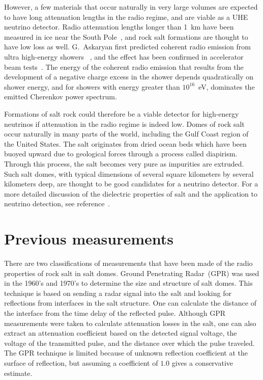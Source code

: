 \documentclass{elsart}
\begin{document}
  However, a few materials that occur naturally in very large volumes are expected to have 
  long attenuation lengths in the radio regime, and are 
  viable as a UHE neutrino detector.  Radio attenuation 
  lengths longer 
  than 1~km have been measured in ice near the South Pole~\cite{southpoleice}, and rock salt 
  formations are thought to have low loss as well.
  G.~Askaryan first predicted coherent radio emission from ultra 
  high-energy showers
  ~\cite{askaryan}, and the effect has been confirmed in 
  accelerator beam tests~\cite{sandsaltice}.
  The energy of the coherent radio emission that results from the development 
  of a negative charge excess in the shower depends quadratically on shower energy, and for 
  showers with energy greater than $10^{16}$~eV, dominates 
  the emitted Cherenkov power spectrum.  
  
  Formations of salt rock could therefore be a viable detector for high-energy neutrinos if 
  attenuation in the radio regime is indeed low.  
  Domes of rock salt occur naturally in many parts of the world, including 
  the Gulf Coast region of the United States.  The salt originates from
  dried ocean beds which have been buoyed upward due to geological forces
  through a process called diapirism.  Through this process, the salt
  becomes very pure as impurities are extruded.
  Such salt domes, with typical dimensions of several square kilometers by several kilometers deep, 
  are thought to be good candidates for a neutrino detector.  
  For a more detailed discussion of the dielectric properties of salt and the application to neutrino 
  detection, see reference~\cite{hockley}.

  \section{Previous measurements}
  There are two classifications of measurements that have been made of the radio properties 
  of rock salt in salt domes.  Ground Penetrating Radar~(GPR) was used in the 1960's and 
  1970's to determine the size and structure of salt domes.  This technique is based on sending 
  a radar signal into the salt and 
  looking for reflections from interfaces in the salt structure.  One can calculate the 
  distance of the interface from the time delay of the reflected pulse.  Although GPR measurements 
  were taken to calculate attenuation losses in the salt, one can also extract an attenuation 
  coefficient based on the detected signal voltage, the voltage of the transmitted pulse, and the distance 
  over which the pulse traveled.  The GPR technique is limited because of unknown reflection 
  coefficient at the surface of reflection, but assuming a coefficient of $1.0$ gives a conservative estimate.
\end{document}
